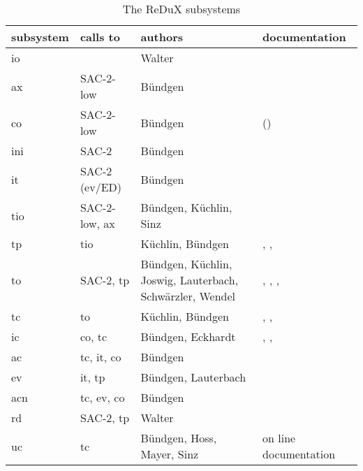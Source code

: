 \begin{table}[hbp]
 \centering
 \begin{tabular}{|l|p{2.9cm}|p{3.6cm}|p{4.6cm}|}
  \hline
  subsystem & calls to & authors & documentation \\ \hline\hline
    io &           & Walter                   &                      \\ \hline
    ax & SAC-2-low & B\"{u}ndgen              &                      \\ \hline
    co & SAC-2-low & B\"{u}ndgen              & (\cite{Buendgen:87}) \\ \hline
    ini & SAC-2    & B\"{u}ndgen              &       \\ \hline
    it &  SAC-2 (ev/ED) &  B\"{u}ndgen              &  \\ \hline
    tio & SAC-2-low, ax & B\"{u}ndgen, K\"{u}chlin, Sinz 
                                              & \cite{SinzBuendgen:95} \\ 
                                                 \hline
    tp & tio & K\"{u}chlin, B\"{u}ndgen & 
                                                \cite{Kuechlin:82a},
                                                \cite{Buendgen:87},
                                                \cite{Buendgen:91b}
                                                \\ \hline
    to & SAC-2, tp & B\"{u}ndgen, K\"{u}chlin, Joswig, Lauterbach,
                          Schw\"{a}rzler, Wendel &  
                                              \cite{Kuechlin:82a},
                                              \cite{Joswig:90},
                                              \cite{Schwaerzler:86},
                                              \cite{Buendgen:91b} \\ \hline
    tc & to & K\"{u}chlin, B\"{u}ndgen & \cite{Kuechlin:82a}, 
                                                \cite{Kuechlin:86}, 
                                                \cite{Buendgen:91b} \\ \hline
    ic & co, tc & B\"{u}ndgen, Eckhardt & \cite{Buendgen:87},
                                              \cite{Buendgen:91b},
                                              \cite{Eckhardt:91} \\ \hline
    ac & tc, it, co      & B\"{u}ndgen &  \cite{Buendgen:91b} \\ \hline
    ev & it, tp          & B\"{u}ndgen, Lauterbach & \\ \hline
    acn & tc, ev, co     & B\"{u}ndgen & \\ \hline
    rd & SAC-2, tp & Walter & \\ \hline
    uc & tc & B\"{u}ndgen, Hoss, Mayer, Sinz & on line documentation \\ \hline
 \end{tabular}
 \caption{The ReDuX subsystems} \label{ta:subsys}
\end{table}

